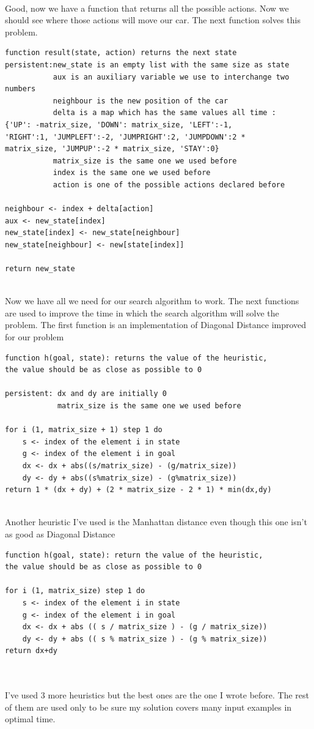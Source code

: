 \documentclass[14pt]{article}
\begin{document}
\newpage
\\ Good, now we have a function that returns all the possible actions. Now we should see where those actions will move our car. The next function solves this problem.
\begin{verbatim}
function result(state, action) returns the next state
persistent:new_state is an empty list with the same size as state
           aux is an auxiliary variable we use to interchange two numbers
           neighbour is the new position of the car
           delta is a map which has the same values all time :
{'UP': -matrix_size, 'DOWN': matrix_size, 'LEFT':-1,
'RIGHT':1, 'JUMPLEFT':-2, 'JUMPRIGHT':2, 'JUMPDOWN':2 *
matrix_size, 'JUMPUP':-2 * matrix_size, 'STAY':0}
           matrix_size is the same one we used before
           index is the same one we used before
           action is one of the possible actions declared before
       
neighbour <- index + delta[action] 
aux <- new_state[index]
new_state[index] <- new_state[neighbour]
new_state[neighbour] <- new[state[index]]

return new_state
\end{verbatim}
\\ Now we have all we need for our search algorithm to work. The next functions are used to improve the time in which the search algorithm will solve the problem. The first function is an implementation of Diagonal Distance improved for our problem
\begin{verbatim}
function h(goal, state): returns the value of the heuristic,
the value should be as close as possible to 0

persistent: dx and dy are initially 0
            matrix_size is the same one we used before
            
for i (1, matrix_size + 1) step 1 do
    s <- index of the element i in state
    g <- index of the element i in goal
    dx <- dx + abs((s/matrix_size) - (g/matrix_size)) 
    dy <- dy + abs((s%matrix_size) - (g%matrix_size)) 
return 1 * (dx + dy) + (2 * matrix_size - 2 * 1) * min(dx,dy)
\end{verbatim}
\newpage
\\Another heuristic I've used is the Manhattan distance even though this one isn't as good as Diagonal Distance
\begin{verbatim}
function h(goal, state): return the value of the heuristic,
the value should be as close as possible to 0

for i (1, matrix_size) step 1 do
    s <- index of the element i in state
    g <- index of the element i in goal
    dx <- dx + abs (( s / matrix_size ) - (g / matrix_size))
    dy <- dy + abs (( s % matrix_size ) - (g % matrix_size))
return dx+dy
            
\end{verbatim}
\\I've used 3 more heuristics but the best ones are the one I wrote before. The rest of them are used only to be sure my solution covers many input examples in optimal time.
\end{document}
